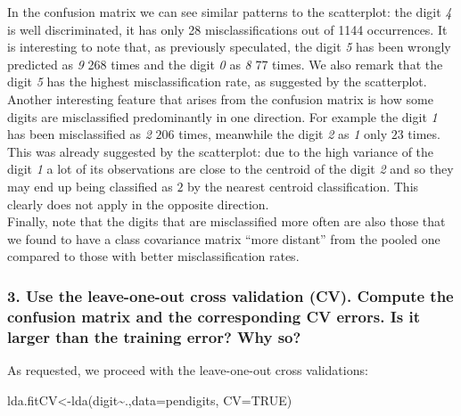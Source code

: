 \documentclass[
  letterpaper,
  DIV=11,
  numbers=noendperiod]{scrartcl}
\newenvironment{Shaded}{\begin{snugshade}}{\end{snugshade}}
\newcommand{\AttributeTok}[1]{\textcolor[rgb]{0.40,0.45,0.13}{#1}}
\newcommand{\ConstantTok}[1]{\textcolor[rgb]{0.56,0.35,0.01}{#1}}
\newcommand{\FunctionTok}[1]{\textcolor[rgb]{0.28,0.35,0.67}{#1}}
\newcommand{\NormalTok}[1]{\textcolor[rgb]{0.00,0.23,0.31}{#1}}
\newcommand{\OtherTok}[1]{\textcolor[rgb]{0.00,0.23,0.31}{#1}}
\newcommand{\SpecialCharTok}[1]{\textcolor[rgb]{0.37,0.37,0.37}{#1}}
\begin{document}
In the confusion matrix we can see similar patterns to the scatterplot:
the digit \emph{4} is well discriminated, it has only 28
misclassifications out of 1144 occurrences. It is interesting to note
that, as previously speculated, the digit \emph{5} has been wrongly
predicted as \emph{9} 268 times and the digit \emph{0} as \emph{8} 77
times. We also remark that the digit \emph{5} has the highest
misclassification rate, as suggested by the scatterplot. Another
interesting feature that arises from the confusion matrix is how some
digits are misclassified predominantly in one direction. For example the
digit \emph{1} has been misclassified as \emph{2} \(206\) times,
meanwhile the digit \emph{2} as \emph{1} only \(23\) times. This was
already suggested by the scatterplot: due to the high variance of the
digit \emph{1} a lot of its observations are close to the centroid of
the digit \emph{2} and so they may end up being classified as \(2\) by
the nearest centroid classification. This clearly does not apply in the
opposite direction.\\
Finally, note that the digits that are misclassified more often are also
those that we found to have a class covariance matrix ``more distant''
from the pooled one compared to those with better misclassification
rates.

\hypertarget{use-the-leave-one-out-cross-validation-cv.-compute-the-confusion-matrix-and-the-corresponding-cv-errors.-is-it-larger-than-the-training-error-why-so}{%
\subsubsection{3. Use the leave-one-out cross validation (CV). Compute
the confusion matrix and the corresponding CV errors. Is it larger than
the training error? Why
so?}\label{use-the-leave-one-out-cross-validation-cv.-compute-the-confusion-matrix-and-the-corresponding-cv-errors.-is-it-larger-than-the-training-error-why-so}}

As requested, we proceed with the leave-one-out cross validations:

\begin{Shaded}
\begin{Highlighting}[]
\NormalTok{lda.fitCV}\OtherTok{\textless{}{-}}\FunctionTok{lda}\NormalTok{(digit}\SpecialCharTok{\textasciitilde{}}\NormalTok{.,}\AttributeTok{data=}\NormalTok{pendigits, }\AttributeTok{CV=}\ConstantTok{TRUE}\NormalTok{)}
\end{Highlighting}
\end{Shaded}
\end{document}
